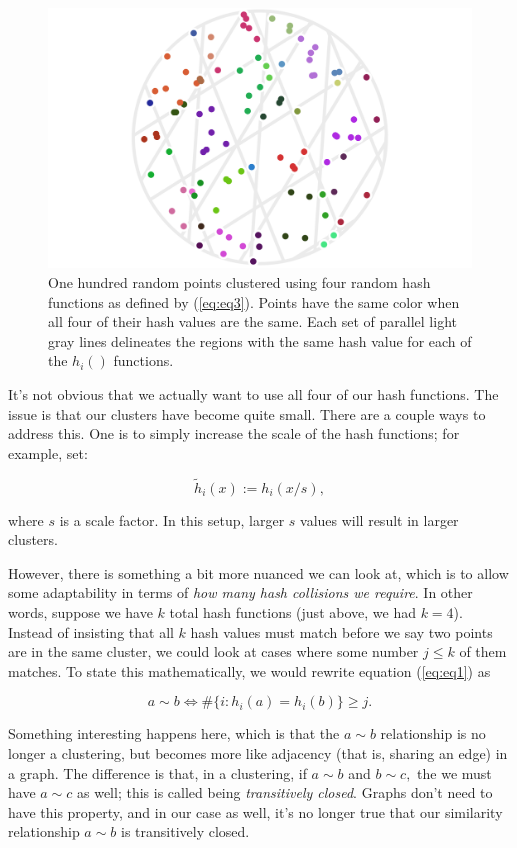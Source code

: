 \documentclass[20pt,]{extarticle}
\begin{document}
\begin{figure}
\centering
\includegraphics{images/lsh_image4.png}
\caption{One hundred random points clustered using four random hash
functions as defined by (\ref{eq:eq3}). Points have the same color when
all four of their hash values are the same. Each set of parallel light
gray lines delineates the regions with the same hash value for each of
the \(h_i()\) functions.}\label{fig:fig4}
\end{figure}

It's not obvious that we actually want to use all four of our hash
functions. The issue is that our clusters have become quite small. There
are a couple ways to address this. One is to simply increase the scale
of the hash functions; for example, set:

\[ \tilde h_i(x) := h_i(x/s), \]

where \(s\) is a scale factor. In this setup, larger \(s\) values will
result in larger clusters.

However, there is something a bit more nuanced we can look at, which is
to allow some adaptability in terms of \emph{how many hash collisions we
require}. In other words, suppose we have \(k\) total hash functions
(just above, we had \(k=4\)). Instead of insisting that all \(k\) hash
values must match before we say two points are in the same cluster, we
could look at cases where some number \(j \le k\) of them matches. To
state this mathematically, we would rewrite equation (\ref{eq:eq1}) as

\begin{equation} a \sim b \iff \#\{i: h_i(a) = h_i(b)\} \ge j. \label{eq:eq2}\end{equation}

Something interesting happens here, which is that the \(a \sim b\)
relationship is no longer a clustering, but becomes more like adjacency
(that is, sharing an edge) in a graph. The difference is that, in a
clustering, if \(a\sim b\) and \(b\sim c,\) the we must have \(a\sim c\)
as well; this is called being \emph{transitively closed}. Graphs don't
need to have this property, and in our case as well, it's no longer true
that our similarity relationship \(a\sim b\) is transitively closed.
\end{document}
